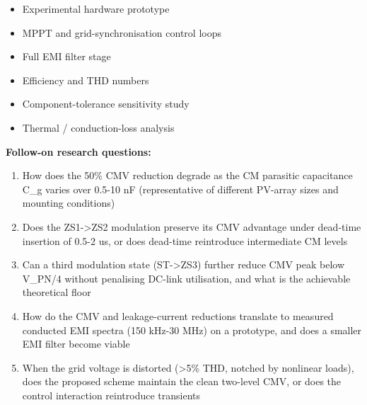 \documentclass[11pt]{article}
\begin{document}
\begin{itemize}[leftmargin=1.4em,itemsep=0.2em,topsep=0.2em]
\item Experimental hardware prototype
\item MPPT and grid-synchronisation control loops
\item Full EMI filter stage
\item Efficiency and THD numbers
\item Component-tolerance sensitivity study
\item Thermal / conduction-loss analysis
\end{itemize}\noindent\textbf{Follow-on research questions:}
\begin{enumerate}[leftmargin=1.6em,itemsep=0.2em,topsep=0.2em,label=Q\arabic*.]
\item How does the 50\% CMV reduction degrade as the CM parasitic capacitance C\_g varies over 0.5-10 nF (representative of different PV-array sizes and mounting conditions)
\item Does the ZS1-\textgreater{}ZS2 modulation preserve its CMV advantage under dead-time insertion of 0.5-2 us, or does dead-time reintroduce intermediate CM levels
\item Can a third modulation state (ST-\textgreater{}ZS3) further reduce CMV peak below V\_PN/4 without penalising DC-link utilisation, and what is the achievable theoretical floor
\item How do the CMV and leakage-current reductions translate to measured conducted EMI spectra (150 kHz-30 MHz) on a prototype, and does a smaller EMI filter become viable
\item When the grid voltage is distorted (\textgreater{}5\% THD, notched by nonlinear loads), does the proposed scheme maintain the clean two-level CMV, or does the control interaction reintroduce transients
\end{enumerate}
\end{document}
